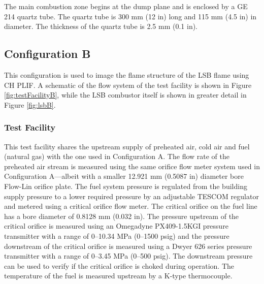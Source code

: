 The main combustion zone begins at the dump plane and is enclosed by a GE 214 quartz tube.
The quartz tube is 300 mm (12 in) long and 115 mm (4.5 in) in diameter.
The thickness of the quartz tube is 2.5 mm (0.1 in).

\subsection{Configuration B}
\label{subsec:lsb-configuration-b}

This configuration is used to image the flame structure of the LSB flame using CH PLIF.
A schematic of the flow system of the test facility is shown in Figure \ref{fig:testFacilityB}, while the LSB combustor itself is shown in greater detail in Figure \ref{fig:lsbB}.

\subsubsection{Test Facility}
\label{subsubsec:configuration-b-test-facility}



This test facility shares the upstream supply of preheated air, cold air and fuel (natural gas) with the one used in Configuration A.
The flow rate of the preheated air stream is measured using the same orifice flow meter system used in Configuration A---albeit with a smaller 12.921 mm (0.5087 in) diameter bore Flow-Lin orifice plate.
The fuel system pressure is regulated from the building supply pressure to a lower required pressure by an adjustable TESCOM regulator and metered using a critical orifice flow meter.
The critical orifice on the fuel line has a bore diameter of 0.8128 mm (0.032 in).
The pressure upstream of the critical orifice is measured using an Omegadyne PX409-1.5KGI pressure transmitter with a range of 0--10.34 MPa (0--1500 psig) and the pressure downstream of the critical orifice is measured using a Dwyer 626 series pressure transmitter with a range of 0--3.45 MPa (0--500 psig).
The downstream pressure can be used to verify if the critical orifice is choked during operation.
The temperature of the fuel is measured upstream by a K-type thermocouple.

